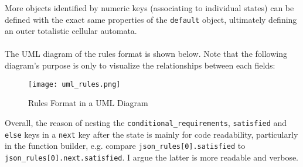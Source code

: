 More objects identified by numeric keys (associating to individual states) can be defined with the exact same properties of the \texttt{default} object, ultimately defining an outer totalistic cellular automata. 
\\ \\
The UML diagram of the rules format is shown below. Note that the following diagram's purpose is only to visualize the relationships between each fields:
\\
\begin{figure}[H]
    \caption{Rules Format in a UML Diagram}
    \centering
    \texttt{[image: uml\_rules.png]}
    \label{uml_rules}
\end{figure}

\noindent Overall, the reason of nesting the \texttt{conditional\_requirements}, \texttt{satisfied} and \texttt{else} keys in a \texttt{next} key after the state is mainly for code readability, particularly in the function builder, e.g. compare \texttt{json\_rules[0].satisfied} to \texttt{json\_rules[0].next.satisfied}. I argue the latter is more readable and verbose.

\newpage

